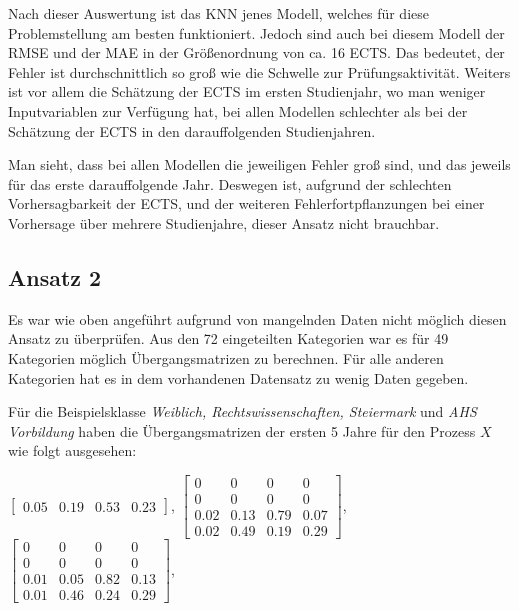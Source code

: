 Nach dieser Auswertung ist das KNN jenes Modell, welches f\"ur diese Problemstellung am besten funktioniert. Jedoch sind auch bei diesem Modell der
RMSE und der MAE in der Gr\"o{\ss}enordnung von ca. 16 ECTS. Das bedeutet, der Fehler ist durchschnittlich so gro{\ss} wie die Schwelle zur Pr\"ufungsaktivit\"at.
Weiters ist vor allem die Sch\"atzung der ECTS im ersten Studienjahr, wo man weniger Inputvariablen zur Verf\"ugung hat, bei allen Modellen schlechter als bei der
Sch\"atzung der ECTS in den darauffolgenden Studienjahren.

Man sieht, dass bei allen Modellen die jeweiligen Fehler gro{\ss} sind, und das jeweils f\"ur das erste darauffolgende Jahr.
Deswegen ist, aufgrund der schlechten Vorhersagbarkeit der ECTS, und der weiteren Fehlerfortpflanzungen bei einer Vorhersage \"uber mehrere Studienjahre,
dieser Ansatz nicht brauchbar.










\subsection{Ansatz 2}
Es war wie oben angef\"uhrt aufgrund von mangelnden Daten nicht m\"oglich diesen Ansatz zu \"uberpr\"ufen.
Aus den 72 eingeteilten Kategorien war es f\"ur 49 Kategorien m\"oglich \"Ubergangsmatrizen zu berechnen. F\"ur alle anderen
Kategorien hat es in dem vorhandenen Datensatz zu wenig Daten gegeben.

F\"ur die Beispielsklasse \textit{Weiblich, Rechtswissenschaften, Steiermark} und  \textit{AHS Vorbildung} haben die \"Ubergangsmatrizen der ersten 5 Jahre f\"ur den Prozess $X$ wie folgt ausgesehen:

$\left[ \begin{array}{rrrr}  0.05 & 0.19 & 0.53 & 0.23  \end{array}\right]$, $\left[ \begin{array}{rrrr} 0 & 0 & 0 & 0 \\  0 & 0 & 0 & 0 \\ 0.02 & 0.13 & 0.79 & 0.07 \\ 0.02 & 0.49 & 0.19 & 0.29 \end{array}\right]$,
$\left[ \begin{array}{rrrr} 0 & 0 & 0 & 0 \\  0 & 0 & 0 & 0 \\ 0.01 & 0.05  & 0.82  & 0.13 \\ 0.01 & 0.46 & 0.24 & 0.29 \end{array}\right]$, \\

